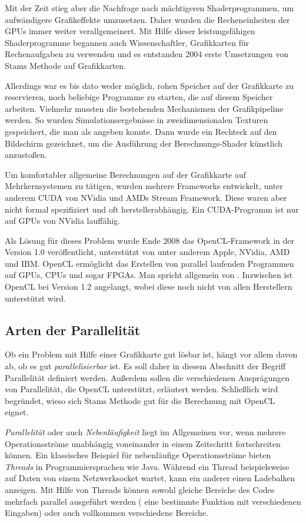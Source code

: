 Mit der Zeit stieg aber die Nachfrage nach mächtigeren Shaderprogrammen, um
aufwändigere Grafikeffekte umzusetzen. Daher wurden die Recheneinheiten der GPUs
immer weiter verallgemeinert. Mit Hilfe dieser leistungsfähigen Shaderprogramme
begannen auch Wissenschaftler, Grafikkarten für Rechenaufgaben zu verwenden und
es entstanden \Pimiddyca{} 2004 erste Umsetzungen von Stams Methode auf
Grafikkarten\cite{Wu2004}.

Allerdings war es bis dato weder möglich, rohen Speicher auf der
Grafikkarte zu reservieren, noch beliebige Programme zu starten, die
auf diesem Speicher arbeiten. Vielmehr mussten die bestehenden
Mechanismen der Grafikpipeline  werden. So
wurden Simulationsergebnisse in zweidimensionalen Texturen
gespeichert, die man als  angeben
konnte. Dann wurde ein Rechteck auf den Bildschirm gezeichnet, um die
Ausführung der Berechnungs-Shader künstlich anzustoßen.

Um komfortabler allgemeine Berechnungen auf der Grafikkarte \Pimiddybzw{} auf
Mehrkernsystemen zu tätigen, wurden mehrere Frameworks entwickelt,
unter anderem CUDA von NVidia und AMDs Stream Framework. Diese waren
aber nicht formal spezifiziert und oft herstellerabhängig. Ein
CUDA-Programm ist \PimiddyzB{} nur auf GPUs von NVidia lauffähig.

Als Lösung für dieses Problem wurde Ende 2008 das OpenCL-Framework in
der Version 1.0 veröffentlicht, unterstützt von unter anderem Apple,
NVidia, AMD und IBM\@. OpenCL ermöglicht das Erstellen von parallel
laufenden Programmen auf GPUs, CPUs und sogar FPGAs. Man spricht
allgemein von . Inzwischen ist
OpenCL bei Version 1.2 angelangt, wobei diese noch nicht von allen
Herstellern unterstützt wird.

\subsection{Arten der Parallelität}

Ob ein Problem mit Hilfe einer Grafikkarte gut lösbar ist, hängt vor allem davon
ab, ob es gut \emph{parallelisierbar} ist. Es soll daher in diesem Abschnitt der
Begriff Parallelität definiert werden. Außerdem sollen die verschiedenen
Ausprägungen von Parallelität, die OpenCL unterstützt, erläutert werden.
Schließlich wird begründet, wieso sich Stams Methode gut für die Berechnung mit
OpenCL eignet.

\emph{Parallelität} oder auch \emph{Nebenläufigkeit} liegt im
Allgemeinen vor, wenn mehrere Operationsströme unabhängig voneinander
in einem Zeitschritt fortschreiten können\cite{munshi2011}. Ein
klassisches Beispiel für nebenläufige Operationsströme bieten
\emph{Threads} in Programmiersprachen wie Java. Während ein Thread
beispielsweise auf Daten von einem Netzwerksocket wartet, kann ein
anderer einen Ladebalken anzeigen. Mit Hilfe von Threads können sowohl
gleiche Bereiche des Codes mehrfach parallel ausgeführt werden
(\PimiddyzB{} eine bestimmte Funktion mit verschiedenen Eingaben) oder
auch vollkommen verschiedene Bereiche.

